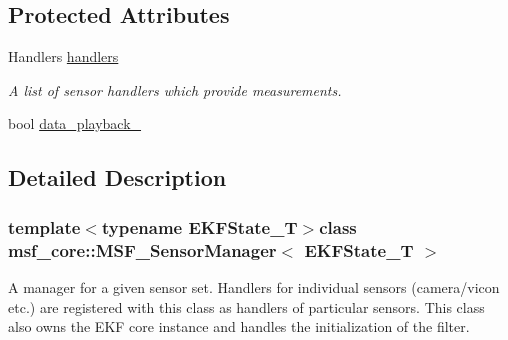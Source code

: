 \subsection*{Protected Attributes}
\begin{DoxyCompactItemize}
\item 
\hypertarget{classmsf__core_1_1MSF__SensorManager_a7c6fe8b491f541562cbf863c452891fd}{Handlers \hyperlink{classmsf__core_1_1MSF__SensorManager_a7c6fe8b491f541562cbf863c452891fd}{handlers}}\label{classmsf__core_1_1MSF__SensorManager_a7c6fe8b491f541562cbf863c452891fd}

\begin{DoxyCompactList}\small\item\em A list of sensor handlers which provide measurements. \end{DoxyCompactList}\item 
bool \hyperlink{classmsf__core_1_1MSF__SensorManager_a49ac85275688e5588b73ed98795abe1a}{data\-\_\-playback\-\_\-}
\end{DoxyCompactItemize}


\subsection{Detailed Description}
\subsubsection*{template$<$typename E\-K\-F\-State\-\_\-\-T$>$class msf\-\_\-core\-::\-M\-S\-F\-\_\-\-Sensor\-Manager$<$ E\-K\-F\-State\-\_\-\-T $>$}

A manager for a given sensor set. Handlers for individual sensors (camera/vicon etc.) are registered with this class as handlers of particular sensors. This class also owns the E\-K\-F core instance and handles the initialization of the filter. 

